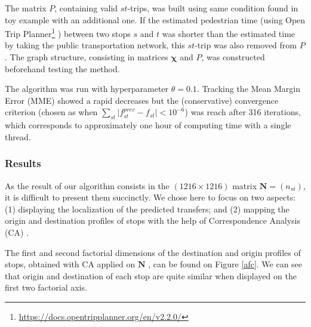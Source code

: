 \documentclass{bmcart}
\begin{document}
The matrix $P$, containing valid $st$-trips, was built using same condition found in toy example with an additional one. If the estimated pedestrian time (using Open Trip Planner\footnote{\url{https://docs.opentripplanner.org/en/v2.2.0/}} \cite{MalcolmMorgan2019}) between two stops $s$ and $t$ was shorter than the estimated time by taking the public transportation network, this $st$-trip was also removed from $P$. The graph structure, consisting in matrices $\bm{\chi}$ and $P$, was constructed beforehand testing the method.

The algorithm was run with hyperparameter $\theta = 0.1$. Tracking the Mean Margin Error (MME) showed a rapid decreases but the (conservative) convergence criterion (chosen as when $\sum_{st} \vert f^{prev}_{st} - f_{st} \vert< 10^{-6} $) was reach after 316 iterations, which corresponds to approximately one hour of computing time with a single thread.

\subsubsection{Results}
\label{real_results}

As the result of our algorithm consists in the $(1216 \times 1216)$ matrix $\mathbf{N} = (n_{st})$, it is difficult to present them succinctly. We chose here to focus on two aspects: (1) displaying the localization of the predicted transfers; and (2) mapping the origin and destination profiles of stops with the help of Correspondence Analysis (CA) \cite{benzecri1977histoire}.

The first and second factorial dimensions of the destination and origin profiles of stops, obtained with CA applied on $\mathbf{N}$ , can be found on Figure \ref{afc}. We can see that origin and destination of each stop are quite similar when displayed on the first two factorial axis. 
\end{document}
